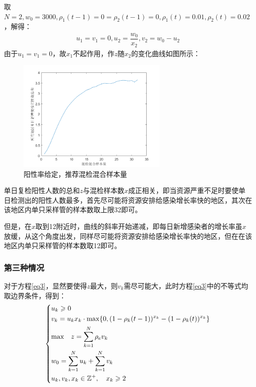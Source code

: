 \documentclass[withoutpreface,bwprint]{cumcmthesis} %
\begin{document}
取$N=2,w_0=3000,\rho_1(t-1)=0=\rho_2(t-1)=0,\rho_1(t)=0.01,\rho_2(t)=0.02$，解得：
\begin{align*}
    u_1=v_1=0, u_2=\dfrac{w_0}{x_2},v_2=w_0-u_2
\end{align*}
由于$u_1=v_1=0$，故$x_1$不起作用，作$z$随$x_2$的变化曲线如图所示：
\begin{figure}[H]
\centering
\includegraphics[width=0.65\textwidth]{fig_pro2.png}
\caption{阳性率给定，推荐混检混合样本量}
\label{pro1}
\end{figure}

单日复检阳性人数的总和$z$与混检样本数$x$成正相关，即当资源严重不足时要使单日检测出的阳性人数最多，首先尽可能将资源安排给感染增长率快的地区，其次在该地区内单只采样管的样本数取上限32即可。

但是，在$x$取到12附近时，曲线的斜率开始递减，即每日新增感染者的增长率虽$x$放缓，从这个角度出发，同样尽可能将资源安排给感染增长率快的地区，但在在该地区内单只采样管的样本数取12即可。

\subsubsection{第三种情况}
对于方程\ref{eq3}，显然要使得$z$最大，则$v_k$需尽可能大，此时方程\ref{eq3}中的不等式均取边界条件，得到：
\begin{align}
\label{eq2solution1}
    \left\{
    \begin{aligned}
        &u_k \geqslant 0 \\
        &v_k =u_k x_k\cdot {\rm max}
         \{0,(1-\rho_k(t-1))^{x_k}-(1-\rho_k(t))^{x_k} \} \\
        &{\rm max} \quad z = \sum^N_{k=1}\rho_e v_k  \\
        &w_0 =\sum^N_{k=1} u_k +\sum^N_{k=1} v_k  \\
        &u_k,v_k,x_k\in\mathbb{Z^+}, \quad x_k \geqslant 2\\
    \end{aligned}
    \right.
\end{align}
\end{document}
